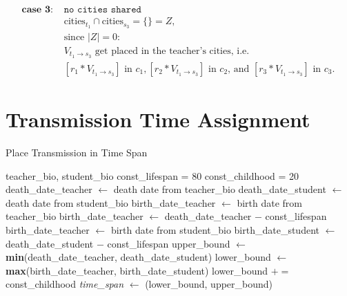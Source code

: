 \documentclass[12pt,english]{article}
\newcommand{\myindent}[1]{
\newline\makebox[#1cm]{}
}
\begin{document}
\begin{center}
\begin{minipage}{.8\linewidth}
\begin{align}
\textbf{case 3}\textbf{:\ }  & \texttt{no cities shared} \\
& \text{cities}_{t_{1}} \cap \text{cities}_{s_{3}} = \{\} = Z, \nonumber \\
& \text{since } |Z| = 0 \text{:} \nonumber \\
& V_{t_{1}\rightarrow s_{3}} \text{ get placed in the teacher's cities, i.e.\ } \nonumber \\
&  \textstyle{[r_{1} * V_{t_{1}\rightarrow s_{3}}]} \text{ in } c_{1}, \textstyle{[r_{2} * V_{t_{1}\rightarrow s_{3}}]} \text{ in } c_{2} \text {, and } \textstyle{[r_{3} * V_{t_{1}\rightarrow s_{3}}]} \text{ in } c_{3}.\ \nonumber
\end{align}
\end{minipage}
\end{center}

\newpage
\section{Transmission Time Assignment} %
\begin{center}
\begin{minipage}{.8\linewidth}
\begin{algorithm}[H]
\caption{Place Transmission in Time Span}\label{euclid}
\begin{algorithmic}[1]
\Require teacher\_bio, student\_bio
\State const\_lifespan = 80
\State const\_childhood = 20
\State death\_date\_teacher $\gets$ death date from  teacher\_bio
\State death\_date\_student $\gets$ death date from student\_bio
    \State birth\_date\_teacher $\gets$ birth date from  teacher\_bio
\Else
    \State birth\_date\_teacher $\gets$ death\_date\_teacher \myindent{4.2} $-$  const\_lifespan
\EndIf 
{}
    \State birth\_date\_teacher $\gets$ birth date from student\_bio
\Else
    \State birth\_date\_student $\gets$ death\_date\_student \myindent{4.2} $-$ const\_lifespan
\EndIf 
\State upper\_bound $\gets$ \textbf{min}(death\_date\_teacher, death\_date\_student)
\State lower\_bound $\gets$ \textbf{max}(birth\_date\_teacher, birth\_date\_student)
{}
    \State lower\_bound $\mathrel{+}=$ const\_childhood
\EndIf 
\State \textit{time\_span} $\gets$ (lower\_bound, upper\_bound)
\end{algorithmic}
\end{algorithm}
\end{minipage}
\end{center}
\end{document}
